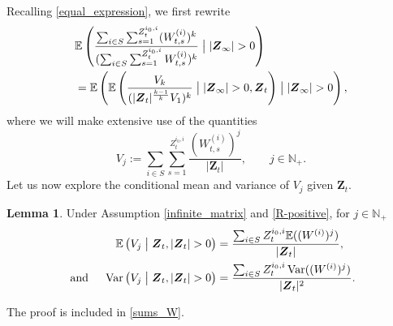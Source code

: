 \documentclass[preprint,3p,12pt]{elsarticle}
\theoremstyle{definition}
\newtheorem{lemma}{Lemma}
\newcommand{\Var}{\operatorname{Var}}
\newcommand{\z}[1][i_0, i]{Z_t^{#1}}
\newcommand{\V}[1]{V_{#1}}
\begin{document}
Recalling \eqref{equal_expression}, we first rewrite
\begin{align}
    &\mathbb{E}\left(\frac{ \sum_{i \in S}\sum_{s=1}^{\z}   (W^{(i)}_{t, s})^k}
    {(\sum_{i \in S} \sum_{s=1}^{\z} W^{(i)}_{t, s})^k}\bigm| |\boldsymbol{Z}_{\infty}| > 0\right) \nonumber\\
    &= \mathbb{E}\left(\mathbb{E}\left(\frac{\V{k}}
    {(|\boldsymbol{Z}_t|^{\frac{k-1}{k}}\V{1})^k}\bigm| |\boldsymbol{Z}_{\infty}| > 0, \boldsymbol{Z}_t  \right)  \bigm| |\boldsymbol{Z}_{\infty}| > 0\right),
    \label{beforeLLN}
\end{align}
where we will make extensive use of the quantities
\begin{equation}
   \V{j} := \sum_{i \in S}\sum_{s=1}^{\z}\frac{(W^{(i)}_{t, s})^j}{|\boldsymbol{Z}_t|}, \qquad j\in\mathbb{N}_+. \label{eq:V}
\end{equation}
Let us now explore the conditional mean and variance of $\V{j}$ given $\boldsymbol{Z}_t$.

\begin{lemma}\label{lemma_moments}
    Under Assumption \ref{infinite_matrix} and \ref{R-positive}, for $j \in \mathbb{N}_+$
      \begin{align} \label{eq:condEidentity}
        \mathbb{E}\left(\V{j}\bigm|  \boldsymbol{Z}_t, |\boldsymbol{Z}_t| > 0 \right) &= \frac{\sum_{i \in S}\z \mathbb{E}((W^{(i)})^j)}{|\boldsymbol{Z}_t|} ,\\
        \text{ and } \quad
        \Var\left(\V{j}\bigm|  \boldsymbol{Z}_t, |\boldsymbol{Z}_t| > 0 \right) &= \frac{\sum_{i \in S} \z \Var((W^{(i)})^j) }{|\boldsymbol{Z}_t|^2}.\label{eq:condVidentity}
    \end{align}
\end{lemma}
The proof is included in \ref{sums_W}.
\end{document}
